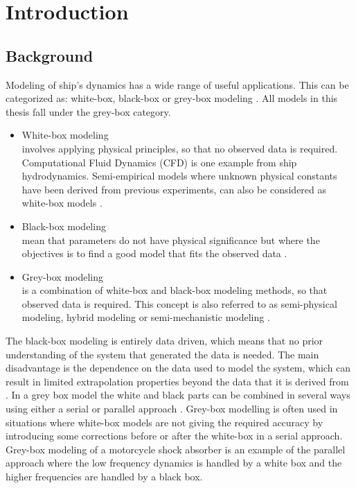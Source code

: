 \chapter{Introduction}
\section{Background}
Modeling of ship’s dynamics has a wide range of useful applications. This can be categorized as: white-box, black-box or grey-box modeling \cite{leifsson_grey-box_2008}. All models in this thesis fall under the grey-box category.

\begin{itemize}
    \item White-box modeling \\
    involves applying physical principles, so that no observed data is required. Computational Fluid Dynamics (CFD) is one example from ship hydrodynamics. Semi-empirical models where unknown physical constants have been derived from previous experiments, can also be considered as white-box models \cite{leifsson_grey-box_2008}.  

    \item Black-box modeling \\
    mean that parameters do not have physical significance but where the objectives is to find a good model that fits the observed data \cite{lindskog_tools_1995}.
    
    \item Grey-box modeling \\
    is a combination of white-box and black-box modeling methods, so that observed data is required. This concept is also referred to as semi-physical modeling, hybrid modeling or semi-mechanistic modeling \cite{leifsson_grey-box_2008}. 
\end{itemize}

The black-box modeling is entirely data driven, which means that no prior understanding of the system that generated the data is needed. The main disadvantage is the dependence on the data used to model the system, which can result in limited extrapolation properties beyond the data that it is derived from \cite{leifsson_grey-box_2008}. 
In a grey box model the white and black parts can be combined in several ways using either a serial or parallel approach \cite{leifsson_grey-box_2008}. 
Grey-box modelling is often used in situations where white-box models are not giving the required accuracy by introducing some corrections before or after the white-box in a serial approach. 
Grey-box modeling of a motorcycle shock absorber \cite{beghi_grey-box_2007} is an example of the parallel approach where the low frequency dynamics is handled by a white box and the higher frequencies are handled by a black box.

